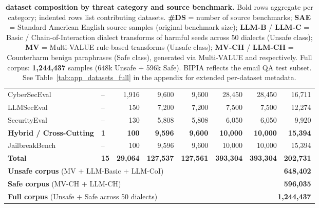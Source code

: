 \begin{table}[t]
\begin{tabular}{llrrrrrr}
\quad CyberSecEval~\cite{bhatt2023cyberseceval}           & -- & 1,916  & 9,600 & 9,600 & 28,450 & 28,450 & 16,711 \\
\quad LLMSecEval~\cite{tony2023llmseceval}                & -- & 150    & 7,200 & 7,200 & 7,500  & 7,500  & 12,274 \\
\quad SecurityEval~\cite{siddiq2022securityeval}          & -- & 130    & 5,808 & 5,808 & 6,050  & 6,050  & 9,920  \\
\midrule
\textbf{Hybrid / Cross-Cutting}       & \textbf{1}  & \textbf{100}     & \textbf{9,596}   & \textbf{9,600}   & \textbf{10,000}   & \textbf{10,000}   & \textbf{15,394}  \\
\quad JailbreakBench~\cite{chao2024jailbreakbench}        & -- & 100    & 9,596 & 9,600 & 10,000 & 10,000 & 15,394 \\
\midrule
\textbf{Total}               & \textbf{15} & \textbf{29,064} & \textbf{127,537} & \textbf{127,561} & \textbf{393,304} & \textbf{393,304} & \textbf{202,731} \\
\midrule
\multicolumn{6}{l}{\textbf{Unsafe corpus} (MV $+$ LLM-Basic $+$ LLM-CoI)}       & \multicolumn{2}{r}{\textbf{648,402}} \\
\multicolumn{6}{l}{\textbf{Safe corpus} (MV-CH $+$ LLM-CH)}                    & \multicolumn{2}{r}{\textbf{596,035}} \\
\multicolumn{6}{l}{\textbf{Full \dataset{} corpus} (Unsafe $+$ Safe across 50 dialects)} & \multicolumn{2}{r}{\textbf{1,244,437}} \\
\bottomrule
\end{tabular}
\caption{\textbf{\dataset{} dataset composition by threat category and source benchmark.} Bold rows aggregate per category; indented rows list contributing datasets. \textbf{\#DS} = number of source benchmarks; \textbf{SAE} = Standard American English source samples (original benchmark size); \textbf{LLM-B} / \textbf{LLM-C} = \dllm{} Basic / Chain-of-Interaction dialect transforms of harmful seeds across 50 dialects (Unsafe class); \textbf{MV} = Multi-VALUE rule-based transforms (Unsafe class); \textbf{MV-CH} / \textbf{LLM-CH} = Counterharm benign paraphrases (Safe class), generated via Multi-VALUE and \dllm{} respectively. Full corpus: \textbf{1,244,437} samples (648k Unsafe $+$ 596k Safe). BIPIA reflects the email QA test subset. See Table~\ref{tab:app_datasets_full} in the appendix for extended per-dataset metadata.}
\label{tab:datasets_full}
\end{table}
